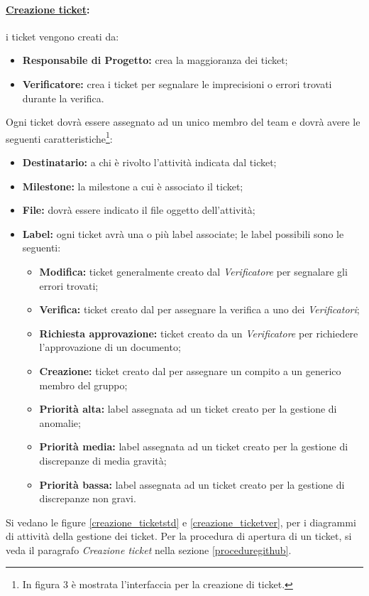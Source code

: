 \paragraph{\underline{Creazione ticket}:} i ticket vengono creati da:
\begin{itemize}
\item \textbf{Responsabile di Progetto:} crea la maggioranza dei ticket;
\item \textbf{Verificatore:} crea i ticket per segnalare le imprecisioni o errori trovati durante la verifica.
\end{itemize}
Ogni ticket dovrà essere assegnato ad un unico membro del team \authorName{} e dovrà avere le seguenti caratteristiche\footnote{In figura 3 è mostrata l'interfaccia per la creazione di ticket.}:
\begin{itemize}
\item{\textbf{Destinatario:}} a chi è rivolto l'attività indicata dal ticket;
\item{\textbf{Milestone:}} la milestone\glossario{} a cui è associato il ticket;
\item{\textbf{File:}} dovrà essere indicato il file oggetto dell'attività;
\item{\textbf{Label:}} ogni ticket avrà una o più label associate; le label possibili sono le seguenti:
\begin{itemize}
\item\textbf{Modifica:} ticket generalmente creato dal \emph{Verificatore} per segnalare gli errori trovati;
\item\textbf{Verifica:} ticket creato dal \projectManager{} per assegnare la verifica a uno dei \emph{Verificatori};
\item\textbf{Richiesta approvazione:} ticket creato da un \emph{Verificatore} per richiedere l'approvazione di un documento;
\item\textbf{Creazione:} ticket creato dal \projectManager{} per assegnare un compito a un generico membro del gruppo;
\item\textbf{Priorità alta:} label assegnata ad un ticket creato per la gestione di anomalie;
\item\textbf{Priorità media:} label assegnata ad un ticket creato per la gestione di discrepanze di media gravità;
\item\textbf{Priorità bassa:} label assegnata ad un ticket creato per la gestione di discrepanze non gravi.
\end{itemize}
\end{itemize}
Si vedano le figure \ref{creazione_ticketstd} e \ref{creazione_ticketver}, per i diagrammi di attività della gestione dei ticket. Per la procedura di apertura di un ticket, si veda il paragrafo \textit{Creazione ticket} nella sezione \ref{proceduregithub}.
